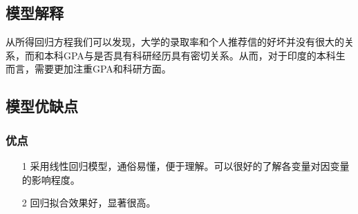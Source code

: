 \documentclass[11pt]{article}
\begin{document}
\subsection{模型解释}
从所得回归方程我们可以发现，大学的录取率和个人推荐信的好坏并没有很大的关系，而和本科GPA与是否具有科研经历具有密切关系。从而，对于印度的本科生而言，需要更加注重GPA和科研方面。
\subsection{模型优缺点}
\subsubsection*{优点}
\begin{itemize}
\item [1] 采用线性回归模型，通俗易懂，便于理解。可以很好的了解各变量对因变量的影响程度。
\item [2] 回归拟合效果好，显著很高。
\end{itemize}
\end{document}
